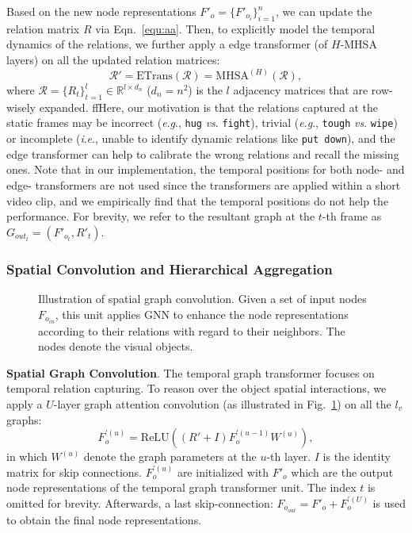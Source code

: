 \documentclass[10pt,journal,compsoc]{IEEEtran}
\newcommand{\vs}{\textit{vs}. }
\newcommand{\ie}{\textit{i}.\textit{e}.}
\newcommand{\eg}{\textit{e}.\textit{g}.}
\begin{document}
Based on the new node representations $F'_o=\{F'_{o_i}\}_{i=1}^n$, we can update the relation matrix $R$ via Eqn.~\eqref{equ:aa}. Then, to explicitly model the temporal dynamics of the relations, we further apply a edge transformer (of $H$-MHSA layers) on all the updated relation matrices: 
\begin{equation}
\label{equ:edge}
    \mathcal{R'} =\text{ETrans}(\mathcal{R}) =\text{MHSA}^{(H)}(\mathcal{R}),
\end{equation}
where $\mathcal{R}\!=\!\{R_t\}_{t=1}^l\in\mathbb{R}^{l \times d_n}$ ($d_n=n^2$) is the $l$ adjacency matrices that are row-wisely expanded. ffHere, our motivation is that the relations captured at the static frames may be incorrect (\eg, \texttt{hug} \vs \texttt{fight}), trivial (\eg, \texttt{tough} \vs \texttt{wipe}) or incomplete (\ie, unable to identify dynamic relations like \texttt{put down}), and the edge transformer can help to calibrate the wrong relations and recall the missing ones. Note that in our implementation, the temporal positions for both node- and edge- transformers are not used since the transformers are applied within a short video clip, and we empirically find that the temporal positions do not help the performance. For brevity, we refer to the resultant graph at the $t$-th frame as $G_{out_t}=(F'_{o_t}, R'_t)$. 

\subsubsection{Spatial Convolution and Hierarchical Aggregation}
\begin{figure}[t]
  \begin{center}
  \end{center}
  \vspace{-0.3cm}
  \caption{Illustration of spatial graph convolution. Given a set of input nodes $F_{o_{in}}$, this unit applies GNN to enhance the node representations according to their relations with regard to their neighbors. The nodes denote the visual objects.}
\label{fig:gr}
\end{figure}
\textbf{Spatial Graph Convolution}. The temporal graph transformer focuses on temporal relation capturing. To reason over the object spatial interactions, we apply a $U$-layer graph attention convolution \cite{kipf2016semi} (as illustrated in Fig.~\ref{fig:gr}) on all the $l_v$ graphs:
\begin{equation}
\label{equ:gcn}
    F^{'(u)}_o = \text{ReLU}((R'+I)F_o^{'(u-1)} W^{(u)}),
\end{equation}
in which $W^{(u)}$ denote the graph parameters at the $u$-th layer. $I$ is the identity matrix for skip connections. $F^{'(u)}_o$ are initialized with $F'_o$ which are the output node representations of the temporal graph transformer unit. The index $t$ is omitted for brevity. Afterwards, a last skip-connection: $F_{o_{out}}=F'_o+F_o^{'(U)}$ is used to obtain the final node representations. 
\end{document}
